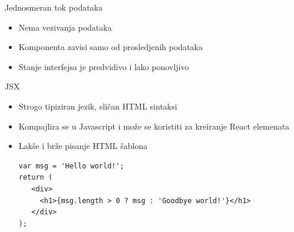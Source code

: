 \documentclass{beamer}
\begin{document}
\begin{frame}{Jednosmeran tok podataka}
    \begin{itemize}
    	\item Nema vezivanja podataka
    	\item Komponenta zavisi samo od prosledjenih podataka
    	\item Stanje interfejsa je predvidivo i lako ponovljivo
    \end{itemize}
\end{frame}
\begin{frame}[fragile]{JSX}
    \begin{itemize}
    	\item Strogo tipiziran jezik, sličan HTML sintaksi
    	\item Kompajlira se u Javascript i može se koristiti za kreiranje React elemenata
		\item Lakše i brže pisanje HTML šablona
		\begin{verbatim}
var msg = 'Hello world!';
return (
   <div>
     <h1>{msg.length > 0 ? msg : 'Goodbye world!'}</h1>
   </div>
);
		\end{verbatim}		     	
    \end{itemize}
\end{frame}
\end{document}
